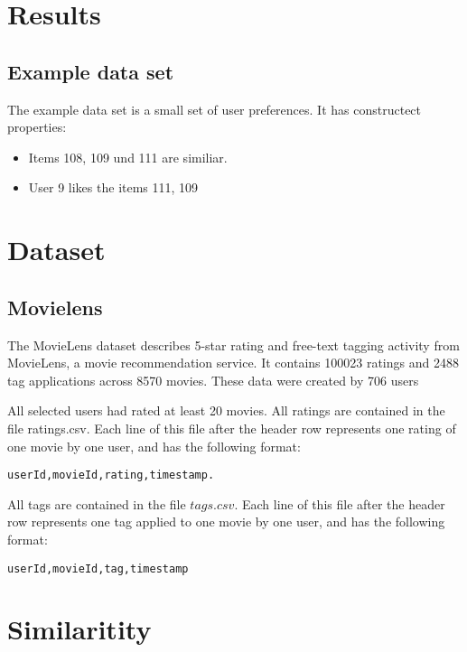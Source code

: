 \documentclass[twoside,a4paper]{article}
\begin{document}
\section{Results}
\label{sec:results}


\subsection{Example data set}
\label{sec:exampledataset}

The example data set is a small set of user preferences. It has constructect properties:
\begin{itemize}
\item Items 108, 109 und 111 are similiar.
\item User 9 likes the items 111, 109 

\end{itemize}

\section{Dataset}
\label{sec:dataset}

\subsection{Movielens}
\label{sec:movielens}

The MovieLens dataset describes 5-star rating and free-text tagging activity from MovieLens, a movie recommendation service. It contains 100023 ratings and 2488 tag applications across 8570 movies. These data were created by 706 users 

All selected users had rated at least 20 movies.
All ratings are contained in the file ratings.csv. Each line of this file after the header row represents one rating of one movie by one user, and has the following format:

\begin{verbatim}
userId,movieId,rating,timestamp.
\end{verbatim}

All tags are contained in the file $tags.csv$. Each line of this file after the header row represents one tag applied to one movie by one user, and has the following format:
\begin{verbatim}
userId,movieId,tag,timestamp
\end{verbatim}

\section{Similaritity}
\label{sec:similarity}
\end{document}
